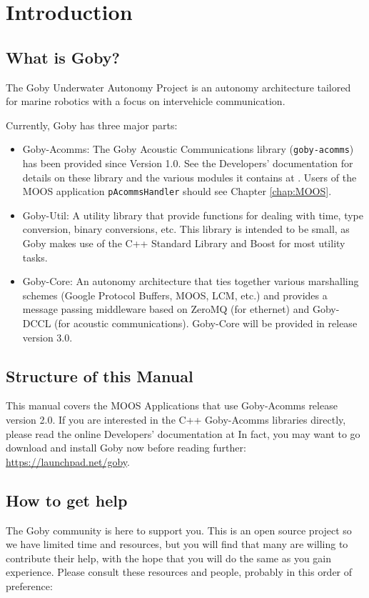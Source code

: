 \chapter{Introduction}

\section{What is Goby?}

The Goby Underwater Autonomy Project is an \gls{autonomy architecture} tailored for marine robotics with a focus on intervehicle communication.

Currently, Goby has three major parts:

\begin{itemize}
\item Goby-Acomms: The Goby Acoustic Communications library (\verb|goby-acomms|) has been provided since Version 1.0. See the Developers' documentation for details on these library and the various modules it contains at \cite{goby-doc}. Users of the MOOS application \verb|pAcommsHandler| should see Chapter \ref{chap:MOOS}.
\item Goby-Util: A utility library that provide functions for dealing with time, type conversion, binary conversions, etc. This library is intended to be small, as Goby makes use of the C++ Standard Library and Boost for most utility tasks.
\item Goby-Core: An \gls{autonomy architecture} that ties together various marshalling schemes (Google Protocol Buffers, MOOS, LCM, etc.) and provides a message passing middleware based on ZeroMQ (for ethernet) and Goby-DCCL (for acoustic communications). Goby-Core will be provided in release version 3.0.
\end{itemize}

\section{Structure of this Manual}
This manual covers the MOOS Applications that use Goby-Acomms release version 2.0. If you are interested in the C++ Goby-Acomms libraries directly, please read the online Developers' documentation at \cite{goby-doc} In fact, you may want to go download and install Goby now before reading further: \url{https://launchpad.net/goby}.

\section{How to get help}
The Goby community is here to support you. This is an open source project so we have limited time and resources, but you will find that many are willing to contribute their help, with the hope that you will do the same as you gain experience. Please consult these resources and people, probably in this order of preference:

